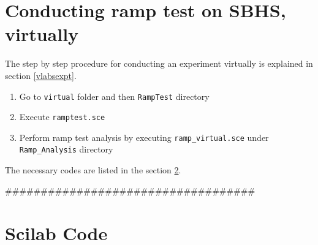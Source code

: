 \section{Conducting ramp test on SBHS, virtually}
The step by step procedure for conducting an experiment virtually is explained in section \ref{vlabsexpt}. 
\begin{enumerate}
 \item Go to {\tt virtual} folder and then {\tt RampTest} directory
 \item Execute {\tt ramptest.sce}
 \item Perform ramp test analysis by executing {\tt ramp\_virtual.sce} under {\tt Ramp\_Analysis} directory
\end{enumerate}

The necessary codes are listed in the section \ref{rampcodes}.


###################################
\section{Scilab Code}\label{rampcodes}
\begin{code}

\end{code}

\begin{code}

\end{code}

\begin{code}

\end{code}

\begin{code}

\end{code}

\begin{code}

\end{code}

\begin{code}

\end{code}

\begin{code}

\end{code}


